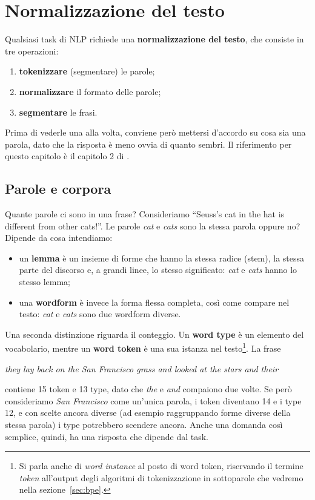 \chapter{Normalizzazione del testo}\label{ch:normalizzazione}
Qualsiasi task di NLP richiede una \textbf{normalizzazione del testo}, che consiste in tre operazioni:
\begin{enumerate}
    \item \textbf{tokenizzare} (segmentare) le parole;
    \item \textbf{normalizzare} il formato delle parole;
    \item \textbf{segmentare} le frasi.
\end{enumerate}
Prima di vederle una alla volta, conviene però mettersi d'accordo su cosa sia una parola, dato che la risposta è meno ovvia di quanto sembri. Il riferimento per questo capitolo è il capitolo 2 di \cite{jurafsky2026slp}.

\section{Parole e corpora}\label{sec:parole}
Quante parole ci sono in una frase? Consideriamo \enquote{Seuss's cat in the hat is different from other cats!}. Le parole \textit{cat} e \textit{cats} sono la stessa parola oppure no? Dipende da cosa intendiamo:
\begin{itemize}
    \item un \textbf{lemma} è un insieme di forme che hanno la stessa radice (stem), la stessa parte del discorso e, a grandi linee, lo stesso significato: \textit{cat} e \textit{cats} hanno lo stesso lemma;
    \item una \textbf{wordform} è invece la forma flessa completa, così come compare nel testo: \textit{cat} e \textit{cats} sono due wordform diverse.
\end{itemize}

Una seconda distinzione riguarda il conteggio. Un \textbf{word type} è un elemento del vocabolario, mentre un \textbf{word token} è una sua istanza nel testo\footnote{Si parla anche di \textit{word instance} al posto di word token, riservando il termine \textit{token} all'output degli algoritmi di tokenizzazione in sottoparole che vedremo nella sezione~\ref{sec:bpe}.}. La frase
\begin{center}
\textit{they lay back on the San Francisco grass and looked at the stars and their}
\end{center}
contiene 15 token e 13 type, dato che \textit{the} e \textit{and} compaiono due volte. Se però consideriamo \textit{San Francisco} come un'unica parola, i token diventano 14 e i type 12, e con scelte ancora diverse (ad esempio raggruppando forme diverse della stessa parola) i type potrebbero scendere ancora. Anche una domanda così semplice, quindi, ha una risposta che dipende dal task.

